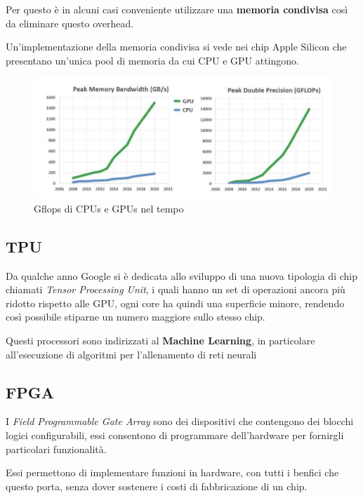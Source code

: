 Per questo è in alcuni casi conveniente utilizzare una \textbf{memoria condivisa} così da eliminare questo overhead.

Un'implementazione della memoria condivisa si vede nei chip Apple Silicon che presentano un'unica pool di memoria da cui CPU e GPU attingono.

\begin{figure}[H]
    \centering
    \includegraphics[width=0.65\linewidth]{assets/gflops-gpu-cpu.jpg}
    \caption{Gflops di CPUs e GPUs nel tempo}
\end{figure}

\subsection{TPU}
Da qualche anno Google si è dedicata allo sviluppo di una nuova tipologia di chip chiamati \textit{Tensor Processing Unit}, i quali hanno un set di operazioni ancora più ridotto rispetto alle GPU, ogni core ha quindi una superficie minore, rendendo così possibile stiparne un numero maggiore sullo stesso chip.

\spacer
Questi processori sono indirizzati al \textbf{Machine Learning}, in particolare all'esecuzione di algoritmi per l'allenamento di reti neurali

\subsection{FPGA}

I \textit{Field Programmable Gate Array} sono dei dispositivi che contengono dei blocchi logici configurabili, essi consentono di programmare dell'hardware per fornirgli particolari funzionalità.

\spacer
Essi permettono di implementare funzioni in hardware, con tutti i benfici che questo porta, senza dover sostenere i costi di fabbricazione di un chip.
